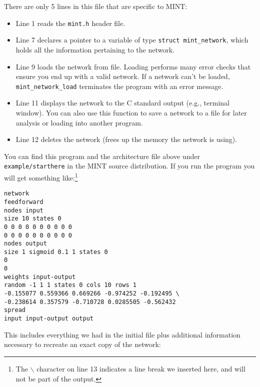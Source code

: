 \documentclass[12pt,letterpaper]{memoir}
\newcommand{\mint}{MINT\xspace}
\begin{document}
There are only 5 lines in this file that are specific to \mint:
\begin{itemize}
\item Line 1 reads the \lstinline{mint.h} header file.
\item Line 7 declares a pointer to a variable of type
  \lstinline{struct mint_network}, which holds all the information
  pertaining to the network.
\item Line 9 loads the network from file. Loading performs many error
  checks that ensure you end up with a valid network. If a network
  can't be loaded, \lstinline{mint_network_load} terminates the
  program with an error message.
\item Line 11 displays the network to the C standard output (e.g.,
  terminal window). You can also use this function to save a network
  to a file for later analysis or loading into another program.
\item Line 12 deletes the network (frees up the memory the network is
  using).
\end{itemize}
You can find this program and the architecture file above under
\lstinline{example/starthere} in the \mint source distribution. If you
run the program you will get something like:\footnote{The $\backslash$
  character on line 13 indicates a line break we inserted here, and
  will not be part of the output.}
\begin{lstlisting}
network
feedforward 
nodes input
size 10 states 0 
0 0 0 0 0 0 0 0 0 0 
0 0 0 0 0 0 0 0 0 0 
nodes output
size 1 sigmoid 0.1 1 states 0 
0 
0 
weights input-output
random -1 1 1 states 0 cols 10 rows 1 
-0.155077 0.559366 0.669266 -0.974252 -0.192495 \
-0.238614 0.357579 -0.710728 0.0285505 -0.562432 
spread
input input-output output 
\end{lstlisting}
This includes everything we had in the initial file plus additional
information necessary to recreate an exact copy of the network:
\end{document}

